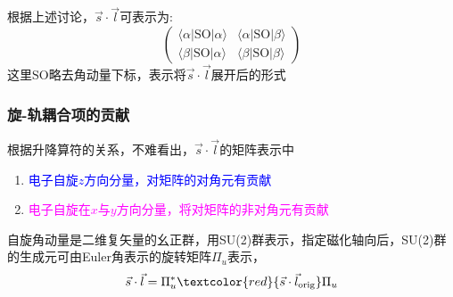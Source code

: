 {{根据上述讨论，$\vec{s}\cdot\vec{l}$可表示为:
\begin{displaymath}
	\begin{pmatrix}
		\langle\alpha|\mathrm{SO}|\alpha\rangle &\langle\alpha|\mathrm{SO}|\beta\rangle \\
		\langle\beta|\mathrm{SO}|\alpha\rangle &\langle\beta|\mathrm{SO}|\beta\rangle
	\end{pmatrix}
\end{displaymath}
这里$\mathrm{SO}$略去角动量下标，表示将$\vec s\cdot\vec l$展开后的形式
}

\frame
{
	\frametitle{旋-轨耦合项的贡献}
根据升降算符的关系，不难看出，$\vec{s}\cdot\vec{l}$的矩阵表示中
\begin{enumerate}
	\item \textcolor{blue}{电子自旋$z$方向分量，对矩阵的对角元有贡献}
	\item \textcolor{magenta}{电子自旋在$x$与$y$方向分量，将对矩阵的非对角元有贡献}
\end{enumerate}

自旋角动量是二维复矢量的幺正群，用\textrm{SU(2)}群表示，指定磁化轴向后，\textrm{SU(2)}群的生成元可由\textrm{Euler}角表示的旋转矩阵$\Pi_u$表示，
\begin{displaymath}
	\vec{s}\cdot\vec{l}= \Pi_u^{\ast}\textcolor{red}{\vec{s}\cdot\vec{l}_{\mathrm{orig}}}\Pi_u
\end{displaymath}
	{\fontsize{6.2pt}{4.2pt}}
}

}
